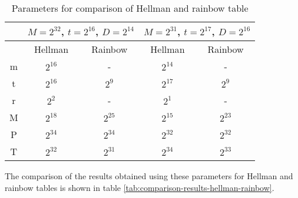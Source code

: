 \begin{table}[ht!]
\begin{center}
\caption{Parameters for comparison of Hellman and rainbow table}
\begin{tabular}{|c|c c||c c|}
\hline
			& \multicolumn{2}{c||}{$M = 2^{32}$, $t = 2^{16}$, $D = 2^{14}$} 	& \multicolumn{2}{c|}{$M = 2^{31}$, $t = 2^{17}$, $D = 2^{16}$}	\\ \hline \hline
			&	Hellman				&	Rainbow					&	Hellman					& Rainbow				\\ \hline \hline
m			&	$2^{16}$			&		-							&	$2^{14}$				& 	-						\\ \hline 
t			&	$2^{16}$			&	$2^{9}$					&	$2^{17}$				& $2^{9}$				\\ \hline 
r			&	$2^{2}$				&		-							&	$2^{1}$					& 	-						\\ \hline 
M			&	$2^{18}$			&	$2^{25}$				&	$2^{15}$				& $2^{23}$			\\ \hline 
P			&	$2^{34}$			&	$2^{34}$				&	$2^{32}$				& $2^{32}$			\\ \hline 
T			&	$2^{32}$			&	$2^{31}$				&	$2^{34}$				& $2^{33}$			\\ \hline 
\end{tabular}
\end{center} 
\label{tab:parameters-comparison}
\end{table}

The comparison of the results obtained using these parameters for Hellman and rainbow tables is shown in table \ref{tab:comparison-results-hellman-rainbow}. 

